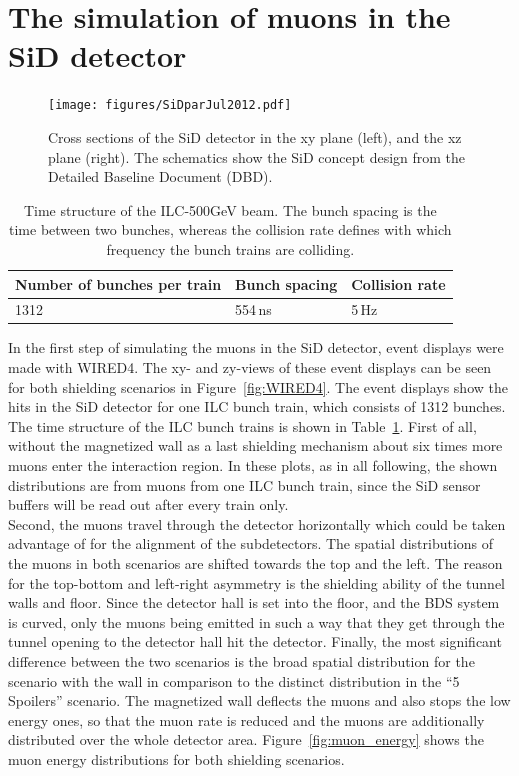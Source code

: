 \section{The simulation of muons in the SiD detector}
\label{Detector}

\begin{figure}
    \centering
    \texttt{[image: figures/SiDparJul2012.pdf]}
    \caption[SiD detector cross sections]{
    Cross sections of the SiD detector in the xy plane (left), and the xz plane (right).
    The schematics show the SiD concept design from the Detailed Baseline Document (DBD).
    }
    \label{fig:SiD}
\end{figure}

\begin{table}
\caption[Time structure of the ILC-500GeV beam.]{Time structure of the ILC-500GeV beam. The bunch spacing is the time between two bunches, whereas the collision rate defines with which frequency the bunch trains are colliding.}
\label{tab:Beam_TimeStructure}
\begin{tabular}{lll}
\hline\hline
\textbf{Number of bunches per train} & \textbf{Bunch spacing} &  \textbf{Collision rate} \tabularnewline
\hline
1312 & \unit{554}\,{ns} & \unit{5}\,{Hz}\tabularnewline
\hline\hline
\end{tabular}
\end{table}

In the first step of simulating the muons in the SiD detector, event displays were made with WIRED4\cite{Wired4}.
The xy- and zy-views of these event displays can be seen for both shielding scenarios in Figure~\ref{fig:WIRED4}.
The event displays show the hits in the SiD detector for one ILC bunch train, which consists of 1312 bunches.
The time structure of the ILC bunch trains is shown in Table~\ref{tab:Beam_TimeStructure}.
First of all, without the magnetized wall as a last shielding mechanism about six times more muons enter the interaction region.
In these plots, as in all following, the shown distributions are from muons from one ILC bunch train, since the SiD sensor buffers will be read out after every train only.\\
Second, the muons travel through the detector horizontally which could be taken advantage of for the alignment of the subdetectors.
The spatial distributions of the muons in both scenarios are shifted towards the top and the left.
The reason for the top-bottom and left-right asymmetry is the shielding ability of the tunnel walls and floor.
Since the detector hall is set into the floor, and the BDS system is curved, only the muons being emitted in such a way that they get through the tunnel opening to the detector hall hit the detector.
Finally, the most significant difference between the two scenarios is the broad spatial distribution for the scenario with the wall in comparison to the distinct distribution in the ``5 Spoilers'' scenario.
The magnetized wall deflects the muons and also stops the low energy ones, so that the muon rate is reduced and the muons are additionally distributed over the whole detector area.
Figure~\ref{fig:muon_energy} shows the muon energy distributions for both shielding scenarios.


